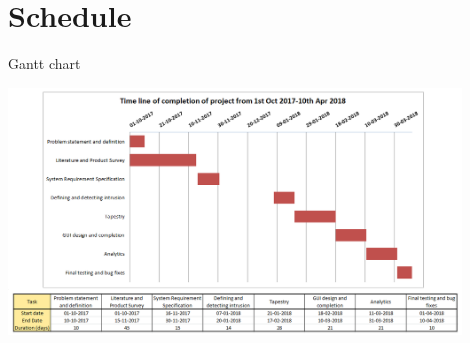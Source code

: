 \documentclass{beamer}
\begin{document}
\begin{frame}
\begin{ganttchart}
\end{ganttchart}




\end{frame}


\section{Schedule}
\begin{frame}{Gantt chart}
  \begin{center}
    \includegraphics[width=12cm,keepaspectratio]{GanttChart.png}
  \end{center}
\end{frame}

\end{document}
